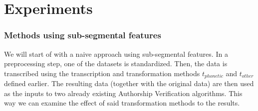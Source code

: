 \chapter{Experiments}\label{experiments}
\subsection{Methods using sub-segmental features}
We will start of with a naive approach using sub-segmental features.
In a preprocessing step, one of the datasets is standardized.
Then, the data is transcribed using the transcription and transformation methods $t_{phonetic}$ and $t_{other}$ defined earlier.
The resulting data (together with the original data) are then used as the inputs to two already existing Authorship Verification algorithms.
This way we can examine the effect of said transformation methods to the results.

